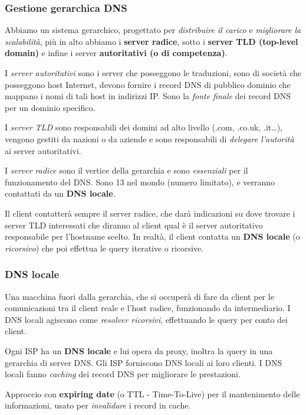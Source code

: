 \subsubsection{Gestione gerarchica DNS}
Abbiamo un sistema gerarchico, progettato per \textit{distribuire il carico} e \textit{migliorare la scalabilità}, più in alto abbiamo i \textbf{server radice}, sotto i \textbf{server TLD (top-level domain)} e infine i server \textbf{autoritativi (o di competenza)}.

I \textit{server autoritativi} sono i server che posseggono le traduzioni, sono di società che posseggono host Internet, devono fornire i record DNS di pubblico dominio che mappano i nomi di tali host in indirizzi IP. Sono la \textit{fonte finale} dei record DNS per un dominio specifico.

I \textit{server TLD} sono responsabili dei domini ad alto livello (.com, .co.uk, .it\dots), vengono gestiti da nazioni o da aziende e sono responsabili di \textit{delegare l'autorità} ai server autoritativi.

I \textit{server radice} sono il vertice della gerarchia e sono \textit{essenziali} per il funzionamento del DNS. Sono 13 nel mondo (numero limitato), e verranno contattati da un \textbf{DNS locale}.

Il client contatterà sempre il server radice, che darà indicazioni su dove trovare i server TLD interessati che diranno al client qual è il server autoritativo responsabile per l'hostname scelto. In realtà, il client contatta un \textbf{DNS locale} (o \textit{ricorsivo}) che poi effettua le query iterative o ricorsive.

\subsubsection{DNS locale}
Una macchina fuori dalla gerarchia, che si occuperà di fare da client per le comunicazioni tra il client reale e l'host radice, funzionando da intermediario. I DNS locali agiscono come \textit{resolver ricorsivi}, effettuando le query per conto dei client.

Ogni ISP ha un \textbf{DNS locale} e lui opera da proxy, inoltra la query in una gerarchia di server DNS. Gli ISP forniscono DNS locali ai loro clienti. I DNS locali fanno \textit{caching} dei record DNS per migliorare le prestazioni.

Approccio con \textbf{expiring date} (o TTL - Time-To-Live) per il mantenimento delle informazioni, usato per \textit{invalidare} i record in cache.

